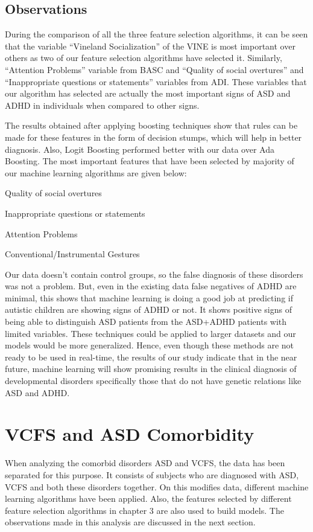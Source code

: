 \subsection{Observations}
During the comparison of all the three feature selection algorithms, it can be seen that the variable “Vineland Socialization” of the VINE is most important over others as two of our feature selection algorithms have selected it. Similarly, “Attention Problems” variable from BASC and “Quality of social overtures” and “Inappropriate questions or statements” variables from ADI. These variables that our algorithm has selected are actually the most important signs of ASD and ADHD in individuals when compared to other signs.

The results obtained after applying boosting techniques show that rules can be made for these features in the form of decision stumps, which will help in better diagnosis. Also, Logit Boosting performed better with our data over Ada Boosting. The most important features that have been selected by majority of our machine learning algorithms are given below:
\begin{compactenum}
\item Quality of social overtures
\item Inappropriate questions or statements
\item Attention Problems
\item Conventional/Instrumental Gestures
\end{compactenum}

Our data doesn’t contain control groups, so the false diagnosis of these disorders was not a problem. But, even in the existing data false negatives of ADHD are minimal, this shows that machine learning is doing a good job at predicting if autistic children are showing signs of ADHD or not. It shows positive signs of being able to distinguish ASD patients from the ASD+ADHD patients with limited variables. These techniques could be applied to larger datasets and our models would be more generalized. Hence, even though these methods are not ready to be used in real-time, the results of our study indicate that in the near future, machine learning will show promising results in the clinical diagnosis of developmental disorders specifically those that do not have genetic relations like ASD and ADHD.

\section{VCFS and ASD Comorbidity}
When analyzing the comorbid disorders ASD and VCFS, the data has been separated for this purpose. It consists of subjects who are diagnosed with ASD, VCFS and both these disorders together. On this modifies data, different machine learning algorithms have been applied. Also, the features selected by different feature selection algorithms in chapter 3 are also used to build models. The observations made in this analysis are discussed in the next section.
